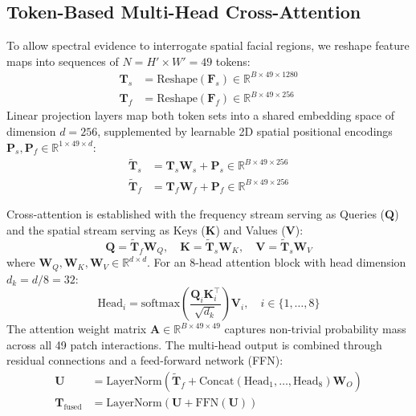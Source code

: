 \documentclass[journal,10pt,twocolumn]{article}
\begin{document}
\subsection{Token-Based Multi-Head Cross-Attention}
To allow spectral evidence to interrogate spatial facial regions, we reshape feature maps into sequences of $N = H' \times W' = 49$ tokens:
\begin{align}
    \mathbf{T}_s &= \text{Reshape}(\mathbf{F}_s) \in \mathbb{R}^{B \times 49 \times 1280} \\
    \mathbf{T}_f &= \text{Reshape}(\mathbf{F}_f) \in \mathbb{R}^{B \times 49 \times 256}
\end{align}
Linear projection layers map both token sets into a shared embedding space of dimension $d = 256$, supplemented by learnable 2D spatial positional encodings $\mathbf{P}_s, \mathbf{P}_f \in \mathbb{R}^{1 \times 49 \times d}$:
\begin{align}
    \tilde{\mathbf{T}}_s &= \mathbf{T}_s \mathbf{W}_s + \mathbf{P}_s \in \mathbb{R}^{B \times 49 \times 256} \\
    \tilde{\mathbf{T}}_f &= \mathbf{T}_f \mathbf{W}_f + \mathbf{P}_f \in \mathbb{R}^{B \times 49 \times 256}
\end{align}

Cross-attention is established with the frequency stream serving as Queries ($\mathbf{Q}$) and the spatial stream serving as Keys ($\mathbf{K}$) and Values ($\mathbf{V}$):
\begin{equation}
    \mathbf{Q} = \tilde{\mathbf{T}}_f \mathbf{W}_Q, \quad \mathbf{K} = \tilde{\mathbf{T}}_s \mathbf{W}_K, \quad \mathbf{V} = \tilde{\mathbf{T}}_s \mathbf{W}_V
\end{equation}
where $\mathbf{W}_Q, \mathbf{W}_K, \mathbf{W}_V \in \mathbb{R}^{d \times d}$. For an 8-head attention block with head dimension $d_k = d / 8 = 32$:
\begin{equation}
    \text{Head}_i = \text{softmax}\left(\frac{\mathbf{Q}_i \mathbf{K}_i^\top}{\sqrt{d_k}}\right) \mathbf{V}_i, \quad i \in \{1, \dots, 8\}
\end{equation}
The attention weight matrix $\mathbf{A} \in \mathbb{R}^{B \times 49 \times 49}$ captures non-trivial probability mass across all 49 patch interactions. The multi-head output is combined through residual connections and a feed-forward network (FFN):
\begin{align}
    \mathbf{U} &= \text{LayerNorm}\left(\tilde{\mathbf{T}}_f + \text{Concat}(\text{Head}_1, \dots, \text{Head}_8)\mathbf{W}_O\right) \\
    \mathbf{T}_{\text{fused}} &= \text{LayerNorm}\left(\mathbf{U} + \text{FFN}(\mathbf{U})\right)
\end{align}
\end{document}
